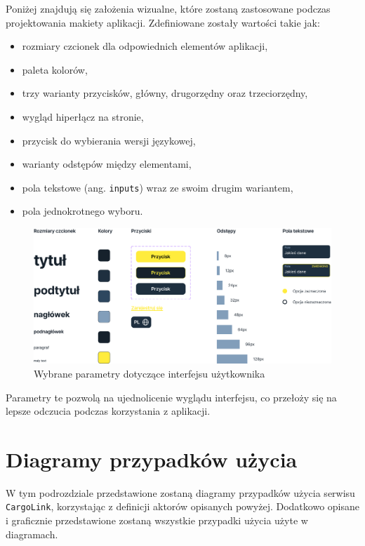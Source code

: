 Poniżej znajdują się założenia wizualne, które zostaną zastosowane podczas projektowania makiety aplikacji. Zdefiniowane zostały wartości takie jak:
\begin{itemize}
    \item rozmiary czcionek dla odpowiednich elementów aplikacji,
    \item paleta kolorów,
    \item trzy warianty przycisków, główny, drugorzędny oraz trzeciorzędny,
    \item wygląd hiperłącz na stronie,
    \item przycisk do wybierania wersji językowej,
    \item warianty odstępów między elementami,
    \item pola tekstowe (ang. \texttt{inputs}) wraz ze swoim drugim wariantem,
    \item pola jednokrotnego wyboru.
\end{itemize}
\begin{figure}[H]
	\centering
		\includegraphics[width=1\linewidth]{rozdzial1/komponenty.png}
	\caption{Wybrane parametry dotyczące interfejsu użytkownika}
	\label{Rys. fig:Wybrane parametry dotyczące interfejsu użytkownika}
\end{figure}
Parametry te pozwolą na ujednolicenie wyglądu interfejsu, co przełoży się na lepsze odczucia podczas korzystania z aplikacji.

\section{Diagramy przypadków użycia}
W tym podrozdziale przedstawione zostaną diagramy przypadków użycia serwisu \texttt{CargoLink}, korzystając z definicji aktorów opisanych powyżej. Dodatkowo opisane i graficznie przedstawione zostaną wszystkie przypadki użycia użyte w diagramach.

